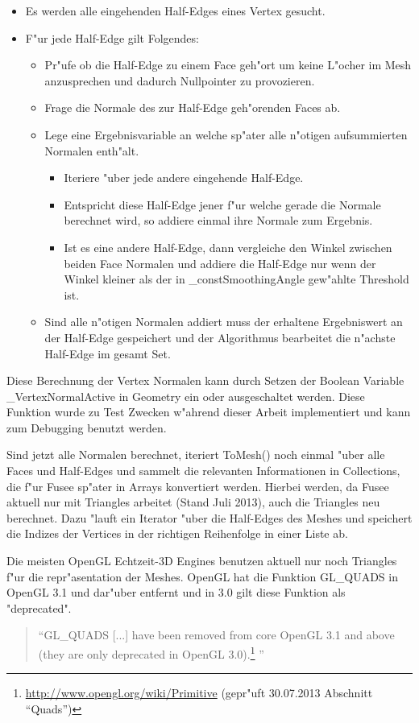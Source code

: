 \documentclass[pagesize, paper=a4, fontsize=12pt,titlepage=true, headings=small, headnosepline, abstractoff, liststotoc, nochapterprefix, plainheadsepline]{scrreprt}
\begin{document}
\begin{itemize}
\item Es werden alle eingehenden Half-Edges eines Vertex gesucht.
\item F"ur jede Half-Edge gilt Folgendes:
	\begin{itemize}
	\item Pr"ufe ob die Half-Edge zu einem Face geh"ort um keine L"ocher im Mesh anzusprechen und dadurch Nullpointer zu provozieren.
	\item Frage die Normale des zur Half-Edge geh"orenden Faces ab.
	\item Lege eine Ergebnisvariable an welche sp"ater alle n"otigen aufsummierten Normalen enth"alt.
		\begin{itemize}
		\item Iteriere "uber jede andere eingehende Half-Edge.
		\item Entspricht diese Half-Edge jener f"ur welche gerade die Normale berechnet wird, so addiere einmal ihre Normale zum Ergebnis.
		\item Ist es eine andere Half-Edge, dann vergleiche den Winkel zwischen beiden Face Normalen und addiere die Half-Edge nur wenn der Winkel kleiner als der in \_constSmoothingAngle gew"ahlte Threshold ist.
		\end{itemize}
	\item Sind alle n"otigen Normalen addiert muss der erhaltene Ergebniswert an der Half-Edge gespeichert und der Algorithmus bearbeitet die n"achste Half-Edge im gesamt Set.
	\end{itemize}
\end{itemize}

Diese Berechnung der Vertex Normalen kann durch Setzen der Boolean Variable \_VertexNormalActive in Geometry ein oder ausgeschaltet werden. Diese Funktion wurde zu Test Zwecken w"ahrend dieser Arbeit implementiert und kann zum Debugging benutzt werden.
\newline

Sind jetzt alle Normalen berechnet, iteriert ToMesh() noch einmal "uber alle Faces und Half-Edges und sammelt die relevanten Informationen in Collections, die f"ur Fusee sp"ater in Arrays konvertiert werden. Hierbei werden, da Fusee aktuell nur mit Triangles arbeitet (Stand Juli 2013), auch die Triangles neu berechnet. Dazu "lauft ein Iterator "uber die Half-Edges des Meshes und speichert die Indizes der Vertices in der richtigen Reihenfolge in einer Liste ab.

Die meisten OpenGL Echtzeit-3D Engines benutzen aktuell nur noch Triangles f"ur die repr"asentation der Meshes. OpenGL hat die Funktion GL\_QUADS in OpenGL 3.1 und dar"uber entfernt und in 3.0 gilt diese Funktion als "deprecated".
\begin{quote}"`GL\_QUADS [...] have been removed from core OpenGL 3.1 and above (they are only deprecated in OpenGL 3.0).\footnote{\url{http://www.opengl.org/wiki/Primitive} (gepr"uft 30.07.2013 Abschnitt "`Quads"')}
"'\end{quote}
\end{document}
